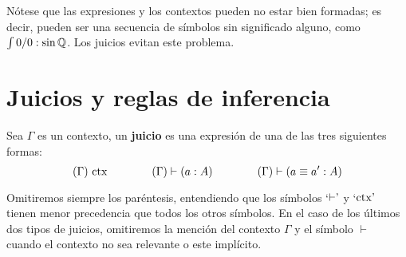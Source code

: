 \documentclass[../main.tex]{subfiles}
\begin{document}
N\'otese que las expresiones y los contextos pueden no estar bien formadas; es decir, pueden ser una secuencia de símbolos sin significado alguno, como $\int 0/0 : \sin \mathbb{Q}$.
Los juicios evitan este problema.

\section{Juicios y reglas de inferencia}
\begin{definition}
    Sea $\Gamma$ es un contexto, un \textbf{juicio} es una expresión de una de las tres siguientes formas:
    $$(\Gamma) \textnormal{ ctx} \hspace{4em}  (\Gamma) \vdash (a:A) \hspace{4em}  (\Gamma) \vdash (a\equiv a':A)$$
\end{definition}
\begin{notation}
    Omitiremos siempre los paréntesis, entendiendo que los símbolos `${\vdash}\textrm'$ y `${\textnormal{ctx}}\textrm'$ tienen menor precedencia que todos los otros símbolos. En el caso de los últimos dos tipos de juicios, omitiremos la mención del contexto $\Gamma$ y el símbolo $\vdash$ cuando el contexto no sea relevante o este implícito.
\end{notation}
\end{document}
